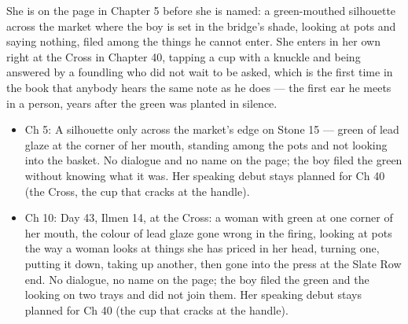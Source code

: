 \documentclass{design/chronicle}
\begin{document}
{
She is on the page in Chapter 5 before she is named: a green-mouthed silhouette across the market where the boy is set in the bridge’s shade, looking at pots and saying nothing, filed among the things he cannot enter. She enters in her own right at the Cross in Chapter 40, tapping a cup with a knuckle and being answered by a foundling who did not wait to be asked, which is the first time in the book that anybody hears the same note as he does --- the first ear he meets in a person, years after the green was planted in silence.

\begin{itemize}[leftmargin=1.4em,itemsep=1pt,topsep=3pt,parsep=0pt]

\item Ch 5: A silhouette only across the market’s edge on Stone 15 --- green of lead glaze at the corner of her mouth, standing among the pots and not looking into the basket. No dialogue and no name on the page; the boy filed the green without knowing what it was. Her speaking debut stays planned for Ch 40 (the Cross, the cup that cracks at the handle).

\end{itemize}

\begin{itemize}[leftmargin=1.4em,itemsep=1pt,topsep=3pt,parsep=0pt]

\item Ch 10: Day 43, Ilmen 14, at the Cross: a woman with green at one corner of her mouth, the colour of lead glaze gone wrong in the firing, looking at pots the way a woman looks at things she has priced in her head, turning one, putting it down, taking up another, then gone into the press at the Slate Row end. No dialogue, no name on the page; the boy filed the green and the looking on two trays and did not join them. Her speaking debut stays planned for Ch 40 (the cup that cracks at the handle).

\end{itemize}
}
\end{document}

